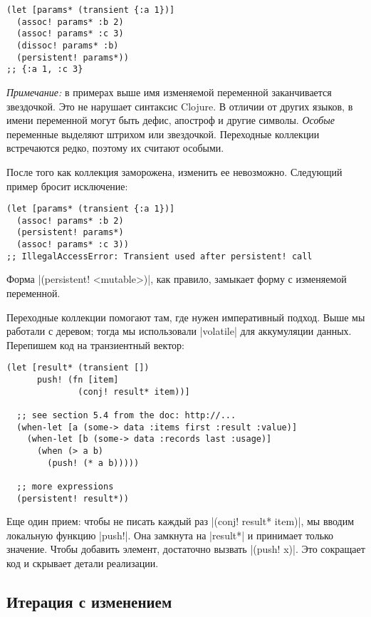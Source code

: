 \begin{verbatim}
(let [params* (transient {:a 1})]
  (assoc! params* :b 2)
  (assoc! params* :c 3)
  (dissoc! params* :b)
  (persistent! params*))
;; {:a 1, :c 3}
\end{verbatim}

\emph{Примечание:} в примерах выше имя изменяемой переменной заканчивается
звездочкой. Это не нарушает синтаксис Clojure. В отличии от других языков, в
имени переменной могут быть дефис, апостроф и другие символы. \emph{Особые}
переменные выделяют штрихом или звездочкой. Переходные коллекции встречаются
редко, поэтому их считают особыми.

После того как коллекция заморожена, изменить ее невозможно. Следующий пример
бросит исключение:

\begin{verbatim}
(let [params* (transient {:a 1})]
  (assoc! params* :b 2)
  (persistent! params*)
  (assoc! params* :c 3))
;; IllegalAccessError: Transient used after persistent! call
\end{verbatim}

Форма \spverb|(persistent! <mutable>)|, как правило, замыкает форму с изменяемой
переменной.

Переходные коллекции помогают там, где нужен императивный подход. Выше мы
работали с деревом; тогда мы использовали \spverb|volatile| для аккумуляции
данных. Перепишем код на транзиентный вектор:

\begin{verbatim}
(let [result* (transient [])
      push! (fn [item]
              (conj! result* item))]

  ;; see section 5.4 from the doc: http://...
  (when-let [a (some-> data :items first :result :value)]
    (when-let [b (some-> data :records last :usage)]
      (when (> a b)
        (push! (* a b)))))

  ;; more expressions
  (persistent! result*))
\end{verbatim}

Еще один прием: чтобы не писать каждый раз \spverb|(conj! result* item)|, мы
вводим локальную функцию \spverb|push!|. Она замкнута на \spverb|result*| и
принимает только значение. Чтобы добавить элемент, достаточно вызвать
\spverb|(push! x)|.  Это сокращает код и скрывает детали реализации.

\subsection{Итерация с изменением}

